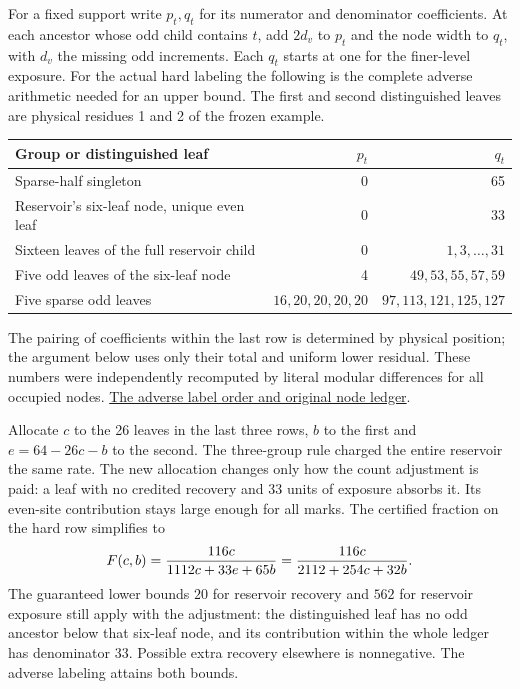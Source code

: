 For a fixed support write \(p_t,q_t\) for its numerator and denominator coefficients. At each ancestor whose odd child contains \(t\), add \(2d_v\) to \(p_t\) and the node width to \(q_t\), with \(d_v\) the missing odd increments. Each \(q_t\) starts at one for the finer-level exposure. For the actual hard labeling the following is the complete adverse arithmetic needed for an upper bound. The first and second distinguished leaves are physical residues 1 and 2 of the frozen example.
\begin{center}
\begin{tabular}{lrr}
\toprule
Group or distinguished leaf & \(p_t\) & \(q_t\)\\
\midrule
Sparse-half singleton &0&65\\
Reservoir's six-leaf node, unique even leaf &0&33\\
Sixteen leaves of the full reservoir child &0&\(1,3,\ldots,31\)\\
Five odd leaves of the six-leaf node &4&\(49,53,55,57,59\)\\
Five sparse odd leaves &\(16,20,20,20,20\)&\(97,113,121,125,127\)\\
\bottomrule
\end{tabular}
\end{center}
The pairing of coefficients within the last row is determined by physical position; the argument below uses only their total and uniform lower residual. These numbers were independently recomputed by literal modular differences for all occupied nodes.
\href{https://github.com/nousentllc/riemann-hypothesis/blob/d67de1f6716496b98c8f0eb9f16b2a38c4f789c4/research/uriel/experiments/ten-percent-study/evidence/worked_example.json}{The adverse label order and original node ledger}.

Allocate \(c\) to the 26 leaves in the last three rows, \(b\) to the first and \(e=64-26c-b\) to the second. The three-group rule charged the entire reservoir the same rate. The new allocation changes only how the count adjustment is paid: a leaf with no credited recovery and 33 units of exposure absorbs it. Its even-site contribution stays large enough for all marks. The certified fraction on the hard row simplifies to
\begin{equation}
 F(c,b)={116c\over 1112c+33e+65b}
        ={116c\over2112+254c+32b}.
 \label{eq:fixed-free}
\end{equation}
The guaranteed lower bounds \(20\) for reservoir recovery and \(562\) for reservoir exposure still apply with the adjustment: the distinguished leaf has no odd ancestor below that six-leaf node, and its contribution within the whole ledger has denominator 33. Possible extra recovery elsewhere is nonnegative. The adverse labeling attains both bounds.

